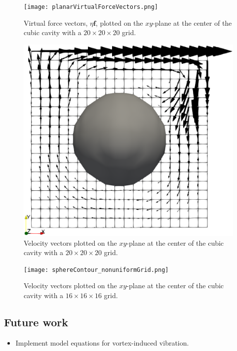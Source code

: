 \documentclass[12pt,a4paper,fleqn]{article}
\begin{document}
\begin{figure}[H]
    \centering
    \texttt{[image: planarVirtualForceVectors.png]}
    \caption{Virtual force vectors, \(\eta \boldsymbol{f}\), plotted on the \(xy\)-plane at the center of the cubic cavity with a \(20 \times 20 \times 20\) grid.}
\end{figure}

\begin{figure}[H]
    \centering
    \includegraphics[width=\linewidth]{planarVelVectors.eps}
    \caption{Velocity vectors plotted on the \(xy\)-plane at the center of the cubic cavity with a \(20 \times 20 \times 20\) grid.}
\end{figure}

\begin{figure}[H]
    \centering
    \texttt{[image: sphereContour\_nonuniformGrid.png]}
    \caption{Velocity vectors plotted on the \(xy\)-plane at the center of the cubic cavity with a \(16 \times 16 \times 16\) grid.}
\end{figure}

\subsection{Future work}
\begin{itemize}
    \item Implement model equations for vortex-induced vibration.
\end{itemize}

\newpage
%
%
\end{document}
